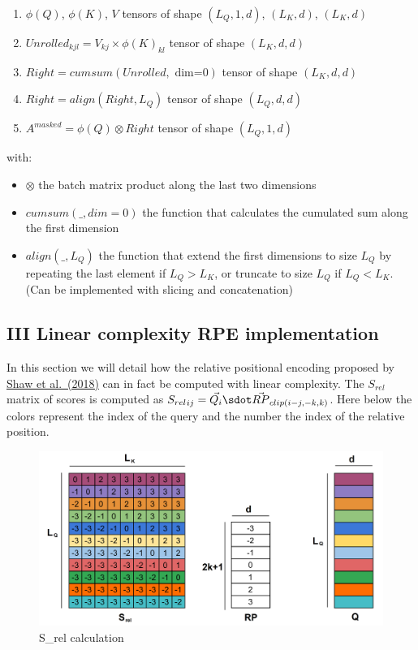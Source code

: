 \begin{enumerate}
\def\labelenumi{\arabic{enumi}.}
\tightlist
\item
  \(\phi(Q)\), \(\phi(K)\), \(V\) tensors of shape \((L_Q, 1, d)\),
  \((L_K, d)\), \((L_K, d)\)
\item
  \(Unrolled_{kjl} = V_{kj} \times \phi(K)_{kl}\) tensor of shape
  \((L_K, d, d)\)
\item
  \(Right = cumsum(Unrolled,\text{ dim=0})\) tensor of shape
  \((L_K, d, d)\)
\item
  \(Right = align(Right, L_Q)\) tensor of shape \((L_Q, d, d)\)
\item
  \(A^{masked} = \phi(Q) \otimes Right\) tensor of shape \((L_Q, 1, d)\)
\end{enumerate}

with:

\begin{itemize}
\tightlist
\item
  \(\otimes\) the batch matrix product along the last two dimensions
\item
  \(cumsum(\_, dim=0)\) the function that calculates the cumulated sum
  along the first dimension
\item
  \(align(\_, L_Q)\) the function that extend the first dimensions to
  size \(L_Q\) by repeating the last element if \(L_Q > L_K\), or
  truncate to size \(L_Q\) if \(L_Q < L_K\). (Can be implemented with
  slicing and concatenation)
\end{itemize}

\hypertarget{iii-linear-complexity-rpe-implementation}{%
\subsection{III Linear complexity RPE
implementation}\label{iii-linear-complexity-rpe-implementation}}

In this section we will detail how the relative positional encoding
proposed by \href{https://arxiv.org/abs/1803.02155}{Shaw et al.~(2018)}
can in fact be computed with linear complexity. The \(S_{rel}\) matrix
of scores is computed as
\({S_{rel}}_{ij} = \vec{Q_i} \sdot \vec{RP}_{clip(i-j, -k, k)}\). Here
below the colors represent the index of the query and the number the
index of the relative position.

\begin{figure}
\centering
\includegraphics{images/S_rel.png}
\caption{S\_rel calculation}
\end{figure}

